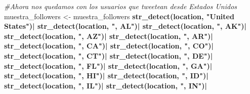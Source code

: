 \documentclass[
]{article}
\newenvironment{Shaded}{\begin{snugshade}}{\end{snugshade}}
\newcommand{\CommentTok}[1]{\textcolor[rgb]{0.56,0.35,0.01}{\textit{#1}}}
\newcommand{\KeywordTok}[1]{\textcolor[rgb]{0.13,0.29,0.53}{\textbf{#1}}}
\newcommand{\NormalTok}[1]{#1}
\newcommand{\OperatorTok}[1]{\textcolor[rgb]{0.81,0.36,0.00}{\textbf{#1}}}
\newcommand{\StringTok}[1]{\textcolor[rgb]{0.31,0.60,0.02}{#1}}
\begin{document}
\begin{Shaded}
\begin{Highlighting}[]
{\CommentTok{#Ahora nos quedamos con los usuarios que tweetean desde Estados Unidos}
\NormalTok{muestra_followers <-}\StringTok{ }\NormalTok{muestra_followers}\OperatorTok{%>%}\KeywordTok{filter}\NormalTok{(}\KeywordTok{str_detect}\NormalTok{(location, }\StringTok{"USA"}\NormalTok{)}\OperatorTok{|}
\StringTok{                                                  }\KeywordTok{str_detect}\NormalTok{(location, }\StringTok{"United States"}\NormalTok{)}\OperatorTok{|}
\StringTok{                                                  }\KeywordTok{str_detect}\NormalTok{(location, }\StringTok{", AL"}\NormalTok{)}\OperatorTok{|}
\StringTok{                                                  }\KeywordTok{str_detect}\NormalTok{(location, }\StringTok{", AK"}\NormalTok{)}\OperatorTok{|}
\StringTok{                                                  }\KeywordTok{str_detect}\NormalTok{(location, }\StringTok{", AZ"}\NormalTok{)}\OperatorTok{|}
\StringTok{                                                  }\KeywordTok{str_detect}\NormalTok{(location, }\StringTok{", AR"}\NormalTok{)}\OperatorTok{|}
\StringTok{                                                  }\KeywordTok{str_detect}\NormalTok{(location, }\StringTok{", CA"}\NormalTok{)}\OperatorTok{|}
\StringTok{                                                  }\KeywordTok{str_detect}\NormalTok{(location, }\StringTok{", CO"}\NormalTok{)}\OperatorTok{|}
\StringTok{                                                  }\KeywordTok{str_detect}\NormalTok{(location, }\StringTok{", CT"}\NormalTok{)}\OperatorTok{|}
\StringTok{                                                  }\KeywordTok{str_detect}\NormalTok{(location, }\StringTok{", DE"}\NormalTok{)}\OperatorTok{|}
\StringTok{                                                  }\KeywordTok{str_detect}\NormalTok{(location, }\StringTok{", FL"}\NormalTok{)}\OperatorTok{|}
\StringTok{                                                  }\KeywordTok{str_detect}\NormalTok{(location, }\StringTok{", GA"}\NormalTok{)}\OperatorTok{|}
\StringTok{                                                  }\KeywordTok{str_detect}\NormalTok{(location, }\StringTok{", HI"}\NormalTok{)}\OperatorTok{|}
\StringTok{                                                  }\KeywordTok{str_detect}\NormalTok{(location, }\StringTok{", ID"}\NormalTok{)}\OperatorTok{|}
\StringTok{                                                  }\KeywordTok{str_detect}\NormalTok{(location, }\StringTok{", IL"}\NormalTok{)}\OperatorTok{|}
\StringTok{                                                  }\KeywordTok{str_detect}\NormalTok{(location, }\StringTok{", IN"}\NormalTok{)}\OperatorTok{|}
}}
\end{Highlighting}
\end{Shaded}
\end{document}

